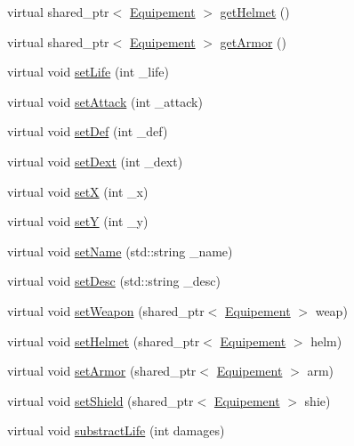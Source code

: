 \begin{DoxyCompactItemize}
\item 
virtual shared\-\_\-ptr$<$ \hyperlink{class_equipement}{Equipement} $>$ \hyperlink{class_character_ac3534a0ae2e17d28220909a673f4cd95}{get\-Helmet} ()
\item 
virtual shared\-\_\-ptr$<$ \hyperlink{class_equipement}{Equipement} $>$ \hyperlink{class_character_ab821499d2b8cdcb135d878c9995ace4c}{get\-Armor} ()
\item 
virtual void \hyperlink{class_character_a91259e5c6dac1f8bfbee2db6155b2a75}{set\-Life} (int \-\_\-life)
\item 
virtual void \hyperlink{class_character_afba6584b7c21ce4e75c88c1e7bd6dea8}{set\-Attack} (int \-\_\-attack)
\item 
virtual void \hyperlink{class_character_a6274ca6b657f591212920d89166ac730}{set\-Def} (int \-\_\-def)
\item 
virtual void \hyperlink{class_character_ab31cb447b16cb88c3f078d0b2c0feb8e}{set\-Dext} (int \-\_\-dext)
\item 
virtual void \hyperlink{class_character_ab666a436a79cfa39a9d30e0025e1287a}{set\-X} (int \-\_\-x)
\item 
virtual void \hyperlink{class_character_a332de99662682fa6512c88ebbb2b28e9}{set\-Y} (int \-\_\-y)
\item 
virtual void \hyperlink{class_character_a60e49a746ceec14e7dfba95f050d52f3}{set\-Name} (std\-::string \-\_\-name)
\item 
virtual void \hyperlink{class_character_a73a895a3fe5c6f68dc0a9e1d04e9bae5}{set\-Desc} (std\-::string \-\_\-desc)
\item 
virtual void \hyperlink{class_character_a293376b90a5af15b873c240cf662a136}{set\-Weapon} (shared\-\_\-ptr$<$ \hyperlink{class_equipement}{Equipement} $>$ weap)
\item 
virtual void \hyperlink{class_character_a4919e0c0f1177631fc6baa3a166ee266}{set\-Helmet} (shared\-\_\-ptr$<$ \hyperlink{class_equipement}{Equipement} $>$ helm)
\item 
virtual void \hyperlink{class_character_ab4535f7a11cdc2ea5b263873c00db7cc}{set\-Armor} (shared\-\_\-ptr$<$ \hyperlink{class_equipement}{Equipement} $>$ arm)
\item 
virtual void \hyperlink{class_character_a2f919221ce089f34778e42c10a826ba8}{set\-Shield} (shared\-\_\-ptr$<$ \hyperlink{class_equipement}{Equipement} $>$ shie)
\item 
virtual void \hyperlink{class_character_acb060fb233be80ddaea98235d1359478}{substract\-Life} (int damages)
\item 

\end{DoxyCompactItemize}
